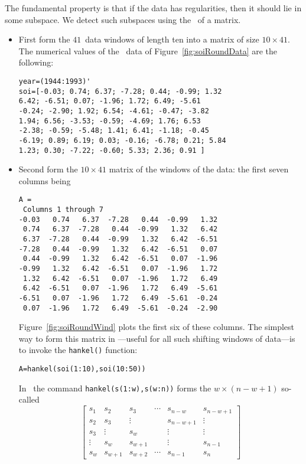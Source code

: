 \begin{example}
The fundamental property is that if the data has regularities, then it should lie in some subspace.
We detect such subspaces using the \svd\ of a matrix.
\begin{itemize}
\item First form the \(41\)~data windows of length ten into a matrix of size \(10\times 41\).
The numerical values of the \soi\ data of Figure~\ref{fig:soiRoundData} are the following:
\begin{verbatim}
year=(1944:1993)'
soi=[-0.03; 0.74; 6.37; -7.28; 0.44; -0.99; 1.32
6.42; -6.51; 0.07; -1.96; 1.72; 6.49; -5.61
-0.24; -2.90; 1.92; 6.54; -4.61; -0.47; -3.82
1.94; 6.56; -3.53; -0.59; -4.69; 1.76; 6.53
-2.38; -0.59; -5.48; 1.41; 6.41; -1.18; -0.45
-6.19; 0.89; 6.19; 0.03; -0.16; -6.78; 0.21; 5.84
1.23; 0.30; -7.22; -0.60; 5.33; 2.36; 0.91 ] 
\end{verbatim}

\item Second form the \(10\times41\) matrix of the windows of the data: the first seven columns being
\begin{verbatim}
A =
 Columns 1 through 7
-0.03   0.74   6.37  -7.28   0.44  -0.99   1.32
 0.74   6.37  -7.28   0.44  -0.99   1.32   6.42
 6.37  -7.28   0.44  -0.99   1.32   6.42  -6.51
-7.28   0.44  -0.99   1.32   6.42  -6.51   0.07
 0.44  -0.99   1.32   6.42  -6.51   0.07  -1.96
-0.99   1.32   6.42  -6.51   0.07  -1.96   1.72
 1.32   6.42  -6.51   0.07  -1.96   1.72   6.49
 6.42  -6.51   0.07  -1.96   1.72   6.49  -5.61
-6.51   0.07  -1.96   1.72   6.49  -5.61  -0.24
 0.07  -1.96   1.72   6.49  -5.61  -0.24  -2.90
\end{verbatim}
Figure~\ref{fig:soiRoundWind} plots the first six of these columns.
The simplest way to form this matrix in \script---useful for all such shifting windows of data---is to invoke the \verb|hankel()| function:
\begin{verbatim}
A=hankel(soi(1:10),soi(10:50))
\end{verbatim}
In \script\ the command \verb|hankel(s(1:w),s(w:n))| forms the \(w\times(n-w+1)\) so-called 
\begin{equation*}
\begin{bmatrix} s_1&s_2&s_3&\cdots&s_{n-w}&s_{n-w+1}
\\s_2&s_3&\vdots&&s_{n-w+1}&\vdots
\\s_3&\vdots&s_w&&\vdots&\vdots
\\\vdots&s_w&s_{w+1}&&\vdots&s_{n-1}
\\s_w&s_{w+1}&s_{w+2}&\cdots&s_{n-1}&s_n \end{bmatrix}
\end{equation*}


\end{itemize}
\end{example}
